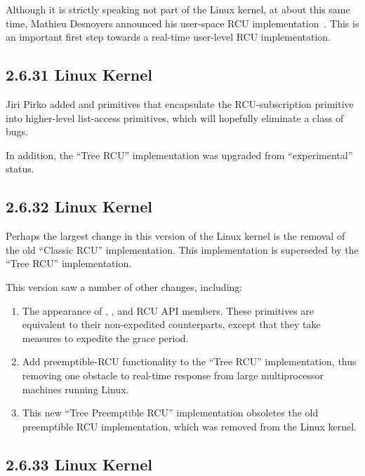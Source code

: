Although it is strictly speaking not part of the Linux kernel, 
at about this same time, Mathieu Desnoyers announced his user-space
RCU implementation~\cite{MathieuDesnoyers2009URCU}.
This is an important first step towards a real-time user-level RCU
implementation.

\subsection{2.6.31 Linux Kernel}

Jiri Pirko added  and 
primitives that encapsulate the  RCU-subscription
primitive into higher-level list-access primitives, which will hopefully
eliminate a class of bugs.

In addition, the ``Tree RCU'' implementation was upgraded from
``experimental'' status.

\subsection{2.6.32 Linux Kernel}

Perhaps the largest change in this version of the Linux kernel
is the removal of the old ``Classic RCU'' implementation.
This implementation is superseded by the ``Tree RCU'' implementation.

This version saw a number of other changes, including:

\begin{enumerate}
\item	The appearance of ,
	, and
	 RCU API members.
	These primitives are equivalent to their non-expedited
	counterparts, except that they take measures to expedite the
	grace period.
\item	Add preemptible-RCU functionality to the ``Tree RCU''
	implementation, thus removing one obstacle to real-time
	response from large multiprocessor machines running Linux.
\item	This new ``Tree Preemptible RCU'' implementation obsoletes
	the old preemptible RCU implementation, which was removed
	from the Linux kernel.
\end{enumerate}

\subsection{2.6.33 Linux Kernel}

